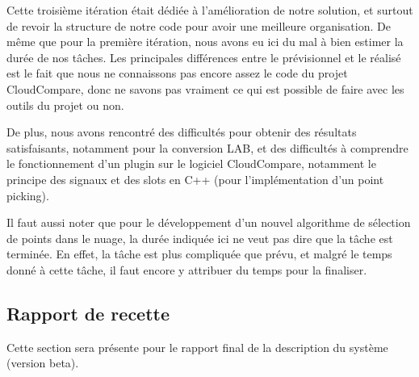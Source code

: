 \documentclass[12pt,titlepage,french]{article}
\begin{document}
Cette troisième itération était dédiée à l'amélioration de notre solution, et surtout de revoir la structure de notre code pour avoir une meilleure organisation. De même que pour la première itération, nous avons eu ici du mal à bien estimer la durée de nos tâches. Les principales différences entre le prévisionnel et le réalisé est le fait que nous ne connaissons pas encore assez le code du projet CloudCompare, donc ne savons pas vraiment ce qui est possible de faire avec les outils du projet ou non. \newline

De plus, nous avons rencontré des difficultés pour obtenir des résultats satisfaisants, notamment pour la conversion LAB, et des difficultés à comprendre le fonctionnement d'un plugin sur le logiciel CloudCompare, notamment le principe des signaux et des slots en C++ (pour l'implémentation d'un point picking). \newline

Il faut aussi noter que pour le développement d'un nouvel algorithme de sélection de points dans le nuage, la durée indiquée ici ne veut pas dire que la tâche est terminée. En effet, la tâche est plus compliquée que prévu, et malgré le temps donné à cette tâche, il faut encore y attribuer du temps pour la finaliser.

\subsection{Rapport de recette}

Cette section sera présente pour le rapport final de la description du système (version beta).
\end{document}
